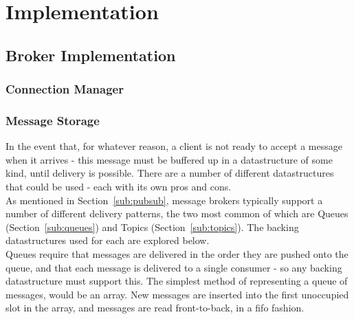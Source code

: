\chapter{Implementation}
\label{chap:Implementation}

\section{Broker Implementation}
\label{sec:Broker Implementation}


\subsection{Connection Manager}
\label{sub:Connection Manager}


\subsection{Message Storage}
\label{sub:Message Handlers}

In the event that, for whatever reason, a client is not ready to accept a
message when it arrives - this message must be buffered up in a datastructure of
some kind, until delivery is possible. There are a number of different
datastructures that could be used - each with its own pros and cons. \\

As mentioned in Section~\ref{sub:pubsub}, message brokers typically support a
number of different delivery patterns, the two most common of which are Queues
(Section~\ref{sub:queues}) and Topics (Section~\ref{sub:topics}). The backing
datastructures used for each are explored below. \\

Queues require that messages are delivered in the order they are pushed onto the
queue, and that each message is delivered to a single consumer - so any backing
datastructure must support this. The simplest method of representing a queue of
messages, would be an array. New messages are inserted into the first unoccupied
slot in the array, and messages are read front-to-back, in a \gls{fifo} fashion.


